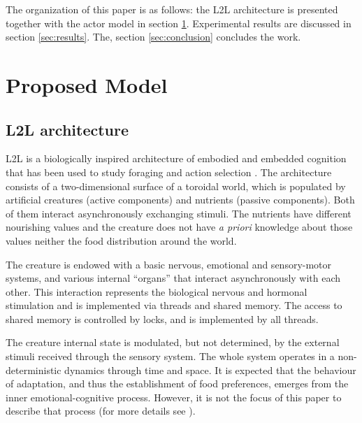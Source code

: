 \documentclass[runningheads]{llncs}
\begin{document}

The organization of this paper is as follows: the L2L architecture is presented together with the actor model in section \ref{sec:model}. Experimental results are discussed in section \ref{sec:results}. The, section \ref{sec:conclusion} concludes the work.

\section{Proposed Model}
\label{sec:model}

\subsection{L2L architecture}
\label{subsec:l2l}
L2L is a biologically inspired architecture of embodied and embedded cognition that has been used to study foraging and action selection \cite{Campos}. The architecture consists of a two-dimensional surface of a toroidal world, which is populated by artificial creatures (active components) and nutrients (passive components). Both of them interact asynchronously exchanging stimuli. The nutrients have different nourishing values and the creature does not have \textit{a priori} knowledge about those values neither the food distribution around the world. 

The creature is endowed with a basic nervous, emotional and sensory-motor systems, and various internal ``organs'' that interact asynchronously with each other. This interaction represents the biological nervous and hormonal stimulation and is implemented via threads and shared memory. The access to shared memory is controlled by locks, and is implemented by all threads.

The creature internal state is modulated, but not determined, by the external stimuli received through the sensory system. The whole system operates in a non-deterministic dynamics through time and space. It is expected that the behaviour of adaptation, and thus the establishment of food preferences, emerges from the inner emotional-cognitive process. However, it is not the focus of this paper to describe that process (for more details see \cite{Campos}).
\end{document}
